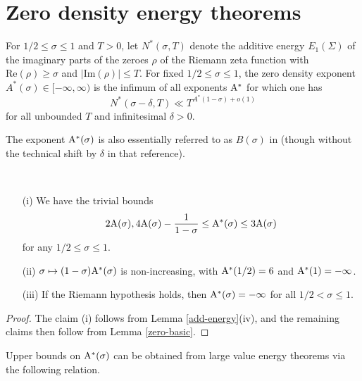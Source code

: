 \chapter{Zero density energy theorems}


\begin{definition}\label{zeroe-def}  For $1/2 \leq \sigma \leq 1$ and $T>0$, let $N^*(\sigma,T)$ denote the additive energy $E_1(\Sigma)$ of the imaginary parts of the zeroes $\rho$ of the Riemann zeta function with $\mathrm{Re}(\rho) \geq \sigma$ and $|\mathrm{Im}(\rho)| \leq T$.  For fixed $1/2 \leq \sigma \leq 1$, the zero density exponent $A^*(\sigma) \in [-\infty,\infty)$ is the infimum of all exponents $\mathrm{A}^*$ for which one has
    $$ N^*(\sigma-\delta,T) \ll T^{A^* (1-\sigma)+o(1)}$$
for all unbounded $T$ and infinitesimal $\delta>0$.
\end{definition}

The exponent $\mathrm{A}^*(\sigma)$ is also essentially referred to as $B(\sigma)$ in \cite{heath_brown_consecutive_II} (though without the technical shift by $\delta$ in that reference).


\begin{lemma}\label{zeroe-basic}\
\begin{itemize}
\item[(i)] We have the trivial bounds
$$ 2\mathrm{A}(\sigma), 4\mathrm{A}(\sigma)-\frac{1}{1-\sigma} \leq \mathrm{A}^*(\sigma) \leq 3 \mathrm{A}(\sigma)$$
for any $1/2 \leq \sigma \leq 1$.
\item[(ii)] $\sigma \mapsto (1-\sigma) \mathrm{A}^*(\sigma)$ is non-increasing, with $\mathrm{A}^*(1/2)=6$ and $\mathrm{A}^*(1)=-\infty$.
\item[(iii)] If the Riemann hypothesis holds, then $\mathrm{A}^*(\sigma)=-\infty$ for all $1/2 < \sigma \leq 1$.
\end{itemize}
\end{lemma}


\begin{proof} The claim (i) follows from Lemma \ref{add-energy}(iv), and the remaining claims then follow from Lemma \ref{zero-basic}.\end{proof}

Upper bounds on $\mathrm{A}^*(\sigma)$ can be obtained from large value energy theorems via the following relation.

